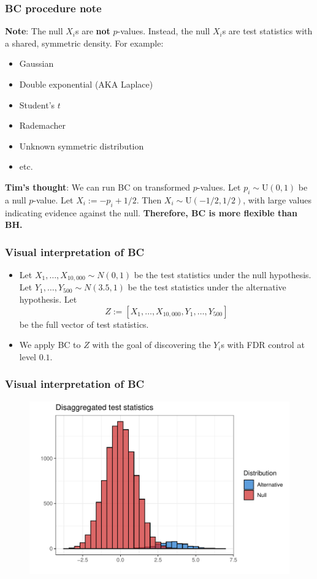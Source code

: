 \documentclass{beamer}
\begin{document}
\begin{frame}
\frametitle{BC procedure note}
\textbf{Note}: The null $X_i$s are \textbf{not} $p$-values. Instead, the null $X_i$s are test statistics with a shared, symmetric density. For example:
\begin{itemize}
\item Gaussian
\item Double exponential (AKA Laplace)
\item Student's $t$
\item Rademacher
\item Unknown symmetric distribution
\item etc.
\end{itemize}
\textbf{Tim's thought}: We can run BC on transformed $p$-values. Let $p_i \sim \textrm{U}(0,1)$ be a null $p$-value. Let $X_i := -p_i + 1/2.$ Then $X_i \sim \textrm{U}(-1/2, 1/2)$, with large values indicating evidence against the null. \textbf{Therefore, BC is more flexible than BH.}
\end{frame}

\begin{frame}
\frametitle{Visual interpretation of BC}
\begin{itemize}
\item Let $X_1, \dots, X_{10,000} \sim N(0,1)$ be the test statistics under the null hypothesis. Let $Y_1, \dots, Y_{500} \sim N(3.5, 1)$ be the test statistics under the alternative hypothesis. Let $$ Z := [X_1, \dots, X_{10,000}, Y_1, \dots, Y_{500}]$$ be the full vector of test statistics. 
\item We apply BC to $Z$ with the goal of discovering the $Y_i$s with FDR control at level $0.1$.
\end{itemize}
\end{frame}

\begin{frame}
\frametitle{Visual interpretation of BC}
\begin{figure}
	\centering
	\includegraphics[width=1\linewidth]{disag_test_stats}
\end{figure}
\end{frame}
\end{document}
